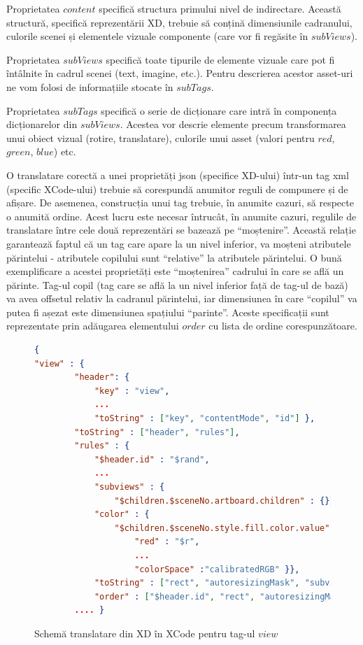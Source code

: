 Proprietatea $content$ specifică structura primului nivel de indirectare. Această structură, specifică reprezentării XD,  trebuie să conțină dimensiunile cadranului, culorile scenei și elementele vizuale componente (care vor fi regăsite în $subViews$).

Proprietatea $subViews$ specifică toate tipurile de elemente vizuale care pot fi întâlnite în cadrul scenei (text, imagine, etc.). Pentru descrierea acestor asset-uri ne vom folosi de informațiile stocate în $subTags$.

Proprietatea $subTags$ specifică o serie de dicționare care intră în componența dicționarelor din $subViews$. Acestea vor descrie elemente precum transformarea unui obiect vizual (rotire, translatare), culorile unui asset (valori pentru $red$, $green$, $blue$) etc.

O translatare corectă a unei proprietăți json (specifice XD-ului) într-un tag xml (specific XCode-ului) trebuie să corespundă anumitor reguli de compunere și de afișare. De asemenea, construcția unui tag trebuie, în anumite cazuri, să respecte o anumită ordine. Acest lucru este necesar întrucât, în anumite cazuri, regulile de translatare între cele două reprezentări se bazează pe “moștenire”. Această relație garantează faptul că un tag care apare la un nivel inferior, va moșteni atributele părintelui - atributele copilului sunt “relative” la atributele părintelui. O bună exemplificare a acestei proprietăți este “moștenirea” cadrului în care se află un părinte. Tag-ul copil (tag care se află la un nivel inferior față de tag-ul de bază) va avea offsetul relativ la cadranul părintelui, iar dimensiunea în care “copilul” va putea fi așezat este dimensiunea spațiului “parinte”. Aceste specificații sunt reprezentate prin adăugarea elementului $order$ cu lista de ordine corespunzătoare.

\begin{figure}
\begin{lstlisting}[language=json,firstnumber=1]
{
"view" : {
        "header": {
            "key" : "view",
            ...
            "toString" : ["key", "contentMode", "id"] },
        "toString" : ["header", "rules"],
        "rules" : { 
            "$header.id" : "$rand",
            ...
            "subviews" : {
                "$children.$sceneNo.artboard.children" : {}},
            "color" : {
                "$children.$sceneNo.style.fill.color.value" : {
                    "red" : "$r",
                    ...
                    "colorSpace" :"calibratedRGB" }},
            "toString" : ["rect", "autoresizingMask", "subviews", "color"],
            "order" : ["$header.id", "rect", "autoresizingMask", "color", "subviews"] }
        .... }
\end{lstlisting}
\caption{Schemă translatare din XD în XCode pentru tag-ul $view$} \label{fig:XD2XCode Schema}
\end{figure}

